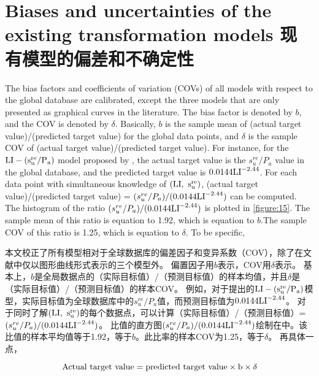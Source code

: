 \section{Biases and uncertainties of the existing transformation models 现有模型的偏差和不确定性}

\begin{paracol}{2}
    
    The bias factors and coefficients of variation (COVs) of all models with respect to the global database are calibrated, except the three models that are only presented as graphical curves in the literature. The bias factor is denoted by $b$, and the COV is denoted by $\delta$. Basically, $b$ is the sample mean of (actual target value)/(predicted target value) for the global data points, and $\delta$ is the sample COV of (actual target value)/(predicted target value). For instance, for the $\rm{LI}-(s_u^{re}/P_a)$ model proposed by \citet{Locat1988799}, the actual target value is the $s_u^{re}/P_a$ value in the global database, and the predicted target value is $0.0144\rm{LI}^{-2.44}$. For each data point with simultaneous knowledge of $(\rm{LI},~s_u^{re})$, (actual target value)/(predicted target value) = $(s_u^{re}/P_a)/(0.0144\rm{LI}^{-2.44})$ can be computed. The histogram of the ratio $(s_u^{re}/P_a)/(0.0144\rm{LI}^{-2.44})$ is plotted in \autoref{figure:15}. The sample mean of this ratio is equation to 1.92, which is equation to $b$.The sample COV of this ratio is 1.25, which is  equation to $\delta$. To be specific,
    
    \switchcolumn
    
    本文校正了所有模型相对于全球数据库的偏差因子和变异系数（COV），除了在文献中仅以图形曲线形式表示的三个模型外。 偏置因子用$b$表示，COV用$\delta$表示。 基本上，$b$是全局数据点的（实际目标值）/（预测目标值）的样本均值，并且$\delta$是（实际目标值）/（预测目标值）的样本COV。 例如，对于\citet{Locat1988799}提出的$\rm{LI}-(s_u^{re}/P_a)$模型，实际目标值为全球数据库中的$s_u^{re}/P_a$值，而预测目标值为$0.0144\rm{LI}^{-2.44}$。 对于同时了解$(\rm{LI},~s_u^{re})$的每个数据点，可以计算（实际目标值）/（预测目标值）= $(s_u^{re}/P_a)/(0.0144\rm{LI}^{-2.44})$。 比值的直方图$(s_u^{re}/P_a)/(0.0144\rm{LI}^{-2.44})$绘制在中。该比值的样本平均值等于1.92，等于$b$。此比率的样本COV为1.25，等于$\delta$。 再具体一点，
\end{paracol}

\begin{equation}
    \rm{Actual~ target~value = predicted~target~value\times{}b\times{}\delta}
    \label{equation:1}
\end{equation}


